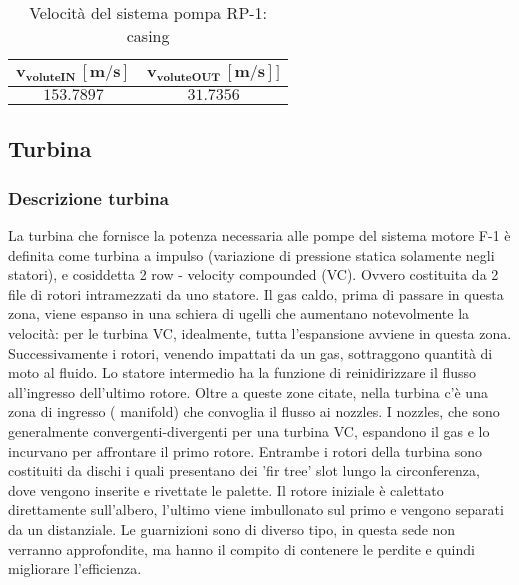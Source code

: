 \begin{table}[H]
\centering
\begin{tabular}{|c|c|}
\hline
$\bm{v_{voluteIN} \, [m/s]}$ & $\bm{v_{voluteOUT} \, [m/s]]}$  \\
\hline
$153.7897$ & $31.7356$   \\
\hline
\end{tabular}

\caption{Velocità del sistema pompa RP-1: casing}
\label{table:RP-1 pump casing}

\end{table}



\subsection{Turbina}
\label{subsec:turbina}

\subsubsection{Descrizione turbina}


La turbina che fornisce la potenza necessaria alle pompe del sistema motore F-1 è definita come turbina a impulso (variazione di pressione statica solamente negli statori), e cosiddetta 2 row - velocity compounded (VC). Ovvero costituita da 2 file di rotori intramezzati da uno statore. Il gas caldo, prima di passare in questa zona, viene espanso in una schiera di ugelli che aumentano notevolmente la velocità: per le turbina VC, idealmente, tutta l'espansione avviene in questa zona. Successivamente i rotori, venendo impattati da un gas, sottraggono quantità di moto al fluido. Lo statore intermedio ha la funzione di reinidirizzare il flusso all'ingresso dell'ultimo rotore. Oltre a queste zone citate, nella turbina c'è una zona di ingresso ( manifold) che convoglia il flusso ai nozzles. I nozzles, che sono generalmente convergenti-divergenti per una turbina VC, espandono il gas e lo incurvano per affrontare il primo rotore. Entrambe i rotori della turbina sono costituiti da dischi i quali presentano dei 'fir tree' slot lungo la circonferenza, dove vengono inserite e rivettate le palette. Il rotore iniziale è calettato direttamente sull'albero, l'ultimo viene imbullonato sul primo e vengono separati da un distanziale. Le guarnizioni sono di diverso tipo, in questa sede non verranno approfondite, ma hanno il compito di contenere le perdite e quindi migliorare l'efficienza. \cite{AIAA_book_2} \cite{turbine_design}

